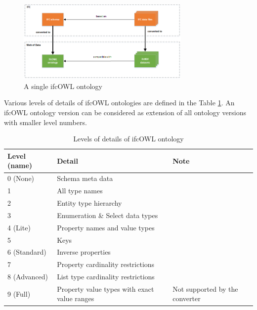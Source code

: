 \begin{figure}[h]
\centering
\includegraphics[width=0.75\textwidth]{images/ifcOWL-single.png}
\caption{A single ifcOWL ontology}
\label{fig:ifcOWL-single}
\end{figure}

Various levels of details of ifcOWL ontologies are defined in the Table \ref{tab:ifcOWL-levels}. An ifcOWL ontology version can be considered as extension of all ontology versions with smaller level numbers. 

\begin{table}[h]
\centering
\footnotesize
\begin{tabularx}{\textwidth}{|X|X|X|}
\hline
\textbf{Level (name)} & \textbf{Detail} & \textbf{Note}   \\

\hline
0 (None) & Schema meta data &   \\

\hline
1 & All type names &   \\

\hline
2 & Entity type hierarchy &   \\

\hline
3 & Enumeration \& Select data types & \\

\hline
4 (Lite) & Property names and value types &   \\

\hline
5 & Keys &   \\

\hline
6 (Standard) & Inverse properties &   \\

\hline
7 & Property cardinality restrictions  &   \\

\hline
8 (Advanced) & List type cardinality restrictions  &   \\

\hline
9 (Full) & Property value types with exact value ranges  & Not supported by the converter  \\

\hline
\end{tabularx}
\caption{Levels of details of ifcOWL ontology}
\label{tab:ifcOWL-levels}
\end{table}

